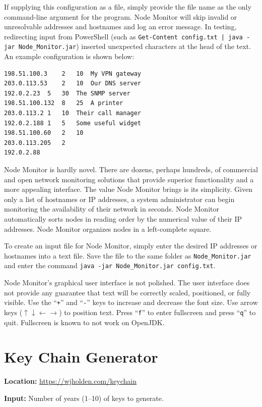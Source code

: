 \documentclass[12pt]{article}
\begin{document}
If supplying this configuration as a file, simply provide the file name as the only command-line argument for the program.
Node Monitor will skip invalid or unresolvable addresses and hostnames and log an error message.
In testing, redirecting input from PowerShell (such as \texttt{Get-Content config.txt | java -jar Node\_Monitor.jar}) inserted unexpected characters at the head of the text.
An example configuration is shown below:

\begin{lstlisting}
198.51.100.3	2	10	My VPN gateway
203.0.113.53	2	10	Our DNS server
192.0.2.23	5	30	The SNMP server
198.51.100.132	8	25	A printer
203.0.113.2	1	10	Their call manager
192.0.2.188	1	5	Some useful widget
198.51.100.60	2	10
203.0.113.205	2
192.0.2.88
\end{lstlisting}

Node Monitor is hardly novel.
There are dozens, perhaps hundreds, of commercial and open network monitoring solutions that provide superior functionality and a more appealing interface.
The value Node Monitor brings is its simplicity.
Given only a list of hostnames or IP addresses, a system administrator can begin monitoring the availability of their network in seconds. Node Monitor automatically sorts nodes in reading order by the numerical value of their IP addresses.
Node Monitor organizes nodes in a left-complete square.

To create an input file for Node Monitor, simply enter the desired IP addresses or hostnames into a text file.
Save the file to the same folder as \texttt{Node\_Monitor.jar} and enter the command \texttt{java -jar Node\_Monitor.jar config.txt}.

Node Monitor's graphical user interface is not polished.
The user interface does not provide any guarantee that text will be correctly scaled, positioned, or fully visible.
Use the ``\texttt{+}'' and ``\texttt{-}'' keys to increase and decrease the font size.
Use arrow keys ($\uparrow\downarrow\leftarrow\rightarrow$) to position text. Press ``\texttt{f}'' to enter fullscreen and press ``\texttt{q}'' to quit.
Fullscreen is known to not work on OpenJDK.

\section{Key Chain Generator} \label{sec:KeyChain}

\noindent \textbf{Location:} \url{https://wjholden.com/keychain}

\noindent \textbf{Input:} Number of years (1--10) of keys to generate.
\end{document}
